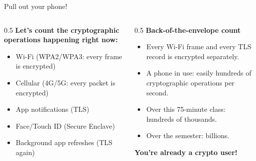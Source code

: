 \ifdefined\PRESENTATION\else\PassOptionsToClass{handout}{beamer}\fi\documentclass[aspectratio=169, lualatex]{beamer}
\begin{document}
\begin{frame}{Pull out your phone!}
	\begin{columns}[c]
		\begin{column}{0.5\textwidth}
			\textbf{Let's count the cryptographic operations happening right now:}
			\begin{itemize}[<+->]
				\item Wi-Fi (WPA2/WPA3: every frame is encrypted)
				\item Cellular (4G/5G: every packet is encrypted)
				\item App notifications (TLS)
				\item Face/Touch ID (Secure Enclave)
				\item Background app refreshes (TLS again)
			\end{itemize}
		\end{column}
		\begin{column}{0.5\textwidth}
			\textbf{Back-of-the-envelope count}
			\begin{itemize}[<+->]
				\item Every Wi-Fi frame and every TLS record is encrypted separately.
				\item A phone in use: easily hundreds of cryptographic operations per second.
				\item Over this 75-minute class: hundreds of thousands.
				\item Over the semester: billions.
			\end{itemize}
			\vspace{0.5cm}
			\textcolor{cipherprimary}{\textbf{You're already a crypto user!}}
		\end{column}
	\end{columns}
\end{frame}
\end{document}
